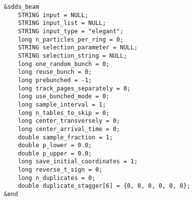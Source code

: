 \documentclass[11pt]{article}
\begin{document}
\begin{verbatim}
&sdds_beam
    STRING input = NULL;
    STRING input_list = NULL;
    STRING input_type = "elegant";
    long n_particles_per_ring = 0;
    STRING selection_parameter = NULL;
    STRING selection_string = NULL;
    long one_random_bunch = 0;
    long reuse_bunch = 0;
    long prebunched = -1;
    long track_pages_separately = 0;
    long use_bunched_mode = 0;
    long sample_interval = 1;
    long n_tables_to_skip = 0;
    long center_transversely = 0;
    long center_arrival_time = 0;
    double sample_fraction = 1;
    double p_lower = 0.0;
    double p_upper = 0.0;
    long save_initial_coordinates = 1;
    long reverse_t_sign = 0;
    long n_duplicates = 0;
    double duplicate_stagger[6] = {0, 0, 0, 0, 0, 0};
&end
\end{verbatim}
\end{document}
